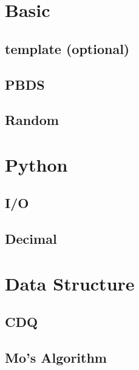 \documentclass[a4paper,10pt,twocolumn,oneside]{article}
\begin{document}
\section{Basic}

\subsection{template (optional)}


% 

\subsection{PBDS}


\subsection{Random}


\section{Python}
\subsection{I/O}


\subsection{Decimal}




\section{Data Structure}

\subsection{CDQ}


\subsection{Mo's Algorithm}

\end{document}
